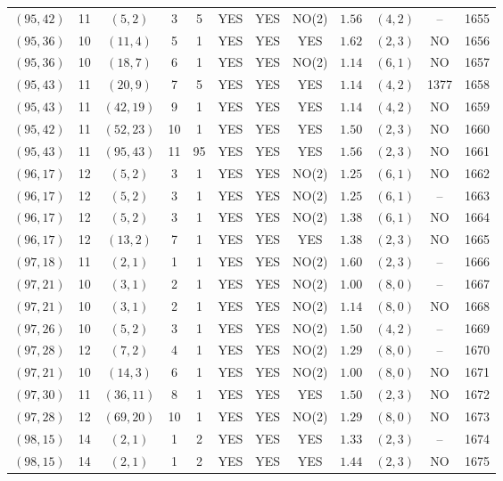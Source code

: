\begin{longtable}{|c|c|c|c|c|c|c|c|c|c|c|c|}
$(95,42)$ & 11 & $(5,2)$ & 3 & 5 & YES & YES & NO(2) & $1.56$ & $(4,2)$ & -- & 1655\\
$(95,36)$ & 10 & $(11,4)$ & 5 & 1 & YES & YES & YES & $1.62$ & $(2,3)$ & NO & 1656\\
$(95,36)$ & 10 & $(18,7)$ & 6 & 1 & YES & YES & NO(2) & $1.14$ & $(6,1)$ & NO & 1657\\
$(95,43)$ & 11 & $(20,9)$ & 7 & 5 & YES & YES & YES & $1.14$ & $(4,2)$ & 1377 & 1658\\
$(95,43)$ & 11 & $(42,19)$ & 9 & 1 & YES & YES & YES & $1.14$ & $(4,2)$ & NO & 1659\\
$(95,42)$ & 11 & $(52,23)$ & 10 & 1 & YES & YES & YES & $1.50$ & $(2,3)$ & NO & 1660\\
$(95,43)$ & 11 & $(95,43)$ & 11 & 95 & YES & YES & YES & $1.56$ & $(2,3)$ & NO & 1661\\
$(96,17)$ & 12 & $(5,2)$ & 3 & 1 & YES & YES & NO(2) & $1.25$ & $(6,1)$ & NO & 1662\\
$(96,17)$ & 12 & $(5,2)$ & 3 & 1 & YES & YES & NO(2) & $1.25$ & $(6,1)$ & -- & 1663\\
$(96,17)$ & 12 & $(5,2)$ & 3 & 1 & YES & YES & NO(2) & $1.38$ & $(6,1)$ & NO & 1664\\
$(96,17)$ & 12 & $(13,2)$ & 7 & 1 & YES & YES & YES & $1.38$ & $(2,3)$ & NO & 1665\\
$(97,18)$ & 11 & $(2,1)$ & 1 & 1 & YES & YES & NO(2) & $1.60$ & $(2,3)$ & -- & 1666\\
$(97,21)$ & 10 & $(3,1)$ & 2 & 1 & YES & YES & NO(2) & $1.00$ & $(8,0)$ & -- & 1667\\
$(97,21)$ & 10 & $(3,1)$ & 2 & 1 & YES & YES & NO(2) & $1.14$ & $(8,0)$ & NO & 1668\\
$(97,26)$ & 10 & $(5,2)$ & 3 & 1 & YES & YES & NO(2) & $1.50$ & $(4,2)$ & -- & 1669\\
$(97,28)$ & 12 & $(7,2)$ & 4 & 1 & YES & YES & NO(2) & $1.29$ & $(8,0)$ & -- & 1670\\
$(97,21)$ & 10 & $(14,3)$ & 6 & 1 & YES & YES & NO(2) & $1.00$ & $(8,0)$ & NO & 1671\\
$(97,30)$ & 11 & $(36,11)$ & 8 & 1 & YES & YES & YES & $1.50$ & $(2,3)$ & NO & 1672\\
$(97,28)$ & 12 & $(69,20)$ & 10 & 1 & YES & YES & NO(2) & $1.29$ & $(8,0)$ & NO & 1673\\
$(98,15)$ & 14 & $(2,1)$ & 1 & 2 & YES & YES & YES & $1.33$ & $(2,3)$ & -- & 1674\\
$(98,15)$ & 14 & $(2,1)$ & 1 & 2 & YES & YES & YES & $1.44$ & $(2,3)$ & NO & 1675\\

\end{longtable}
